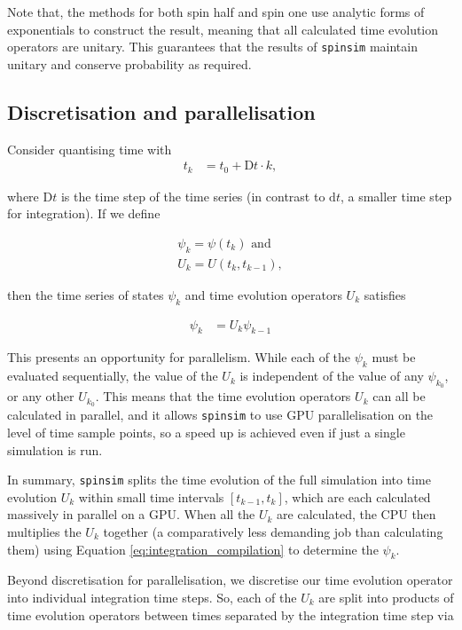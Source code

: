 \documentclass{jors}
\begin{document}
		Note that, the methods for both spin half and spin one use analytic forms of exponentials to construct the result, meaning that all calculated time evolution operators are unitary. This guarantees that the results of \texttt{spinsim} maintain unitary and conserve probability as required.

	\subsection{Discretisation and parallelisation}
		Consider quantising time with
		\begin{align}
			t_k &= t_0 + \mathrm{D}t\cdot k,
		\end{align}

		where \(\mathrm{D}t\) is the time step of the time series (in contrast to \(\mathrm{d}t\), a smaller time step for integration). If we define

		\begin{align}
			\psi_k = \psi(t_k)\textrm{ and}\\
			U_k = U(t_{k}, t_{k-1}),
		\end{align}
		
		then the time series of states \(\psi_k\) and time evolution operators \(U_k\) satisfies

		\begin{align}
			\psi_k &= U_k\psi_{k-1}\label{eq:integration_compilation}
		\end{align}

		This presents an opportunity for parallelism. While each of the \(\psi_k\) must be evaluated sequentially, the value of the \(U_k\) is independent of the value of any \(\psi_{k_0}\), or any other \(U_{k_0}\). This means that the time evolution operators \(U_k\) can all be calculated in parallel, and it allows \texttt{spinsim} to use GPU parallelisation on the level of time sample points, so a speed up is achieved even if just a single simulation is run.

		In summary, \texttt{spinsim} splits the time evolution of the full simulation into time evolution \(U_k\) within small time intervals \([t_{k - 1}, t_{k}]\), which are each calculated massively in parallel on a GPU. When all the \(U_k\) are calculated, the CPU then multiplies the \(U_k\) together (a comparatively less demanding job than calculating them) using Equation \eqref{eq:integration_compilation} to determine the \(\psi_k\).

		Beyond discretisation for parallelisation, we discretise our time evolution operator into individual integration time steps. So, each of the \(U_k\) are split into products of time evolution operators between times separated by the integration time step via
		
\end{document}
